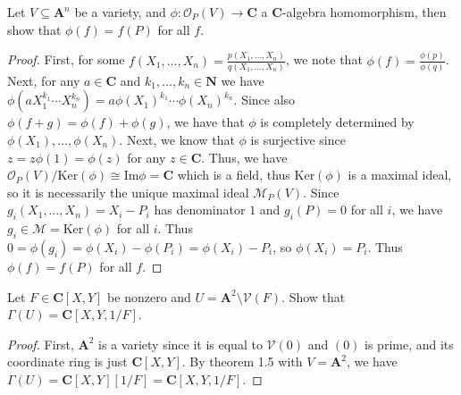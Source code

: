 \documentclass[11pt]{book}
\begin{document}
\begin{problem}
Let $V\subseteq\mathbf A^n$ be a variety, and $\phi:\mathcal{O}_P(V)\rightarrow \mathbf C$ a $\mathbf C$-algebra homomorphism, then show that $\phi(f)=f(P)$ for all $f$.
\begin{proof}
First, for some $f(X_1,\dots,X_n)=\frac{p(X_1,\dots,X_n)}{q(X_1,\dots,X_n)}$, we note that $\phi(f)=\frac{\phi(p)}{\phi(q)}$. Next, for any $a\in\mathbf C$ and $k_1,\dots,k_n\in\mathbf N$ we have $\phi(aX_1^{k_1}\cdots X_n^{k_n})=a\phi(X_1)^{k_1}\cdots\phi(X_n)^{k_n}$. Since also $\phi(f+g)=\phi(f)+\phi(g)$, we have that $\phi$ is completely determined by $\phi(X_1),\dots,\phi(X_n)$. 
Next, we know that $\phi$ is surjective since $z=z\phi(1)=\phi(z)$ for any $z\in\mathbf C$. Thus, we have $\mathcal{O}_P(V)/\mathrm{Ker}(\phi)\cong \mathrm{Im}\phi=\mathbf C$ which is a field, thus $\mathrm{Ker}(\phi)$ is a maximal ideal, so it is necessarily the unique maximal ideal $\mathcal{M}_P(V)$. Since $g_i(X_1,\dots,X_n)=X_i-P_i$ has denominator $1$ and $g_i(P)=0$ for all $i$, we have $g_i\in\mathcal{M}=\mathrm{Ker}(\phi)$ for all $i$. Thus $0=\phi(g_i)=\phi(X_i)-\phi(P_i)=\phi(X_i)-P_i$, so $\phi(X_i)=P_i$. Thus $\phi(f)=f(P)$ for all $f$.
\end{proof}
\end{problem}
\begin{problem}
Let $F\in\mathbf C[X,Y]$ be nonzero and $U=\mathbf A^2\setminus \mathcal{V}(F)$. Show that $\Gamma(U)=\mathbf C[X,Y,1/F]$.
\begin{proof}
First, $\mathbf A^2$ is a variety since it is equal to $\mathcal V(0)$ and $(0)$ is prime, and its coordinate ring is just $\mathbf C[X,Y]$. By theorem 1.5 with $V=\mathbf A^2$, we have $\Gamma(U)=\mathbf C[X,Y][1/F]=\mathbf C[X,Y,1/F]$.
\end{proof}
\end{problem}
\newpage
\end{document}

